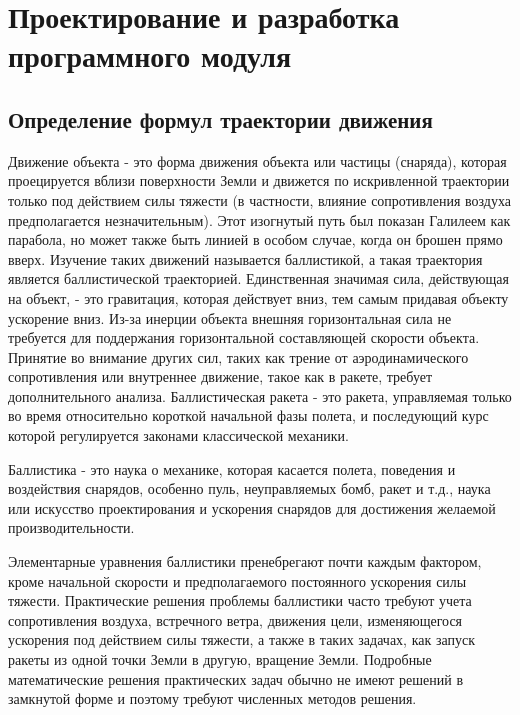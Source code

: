 \section{Проектирование и разработка программного модуля}
\label{sub:domain:sec_project}
\lstset{style=fsharpstyle}  



\subsection{Определение формул траектории движения}

Движение объекта - это форма движения объекта или частицы (снаряда), которая проецируется вблизи поверхности Земли и движется по искривленной траектории только под действием силы тяжести (в частности, влияние сопротивления воздуха предполагается незначительным). Этот изогнутый путь был показан Галилеем как парабола, но может также быть линией в особом случае, когда он брошен прямо вверх. Изучение таких движений называется баллистикой, а такая траектория является баллистической траекторией. Единственная значимая сила, действующая на объект, - это гравитация, которая действует вниз, тем самым придавая объекту ускорение вниз. Из-за инерции объекта внешняя горизонтальная сила не требуется для поддержания горизонтальной составляющей скорости объекта. Принятие во внимание других сил, таких как трение от аэродинамического сопротивления или внутреннее движение, такое как в ракете, требует дополнительного анализа. Баллистическая ракета - это ракета, управляемая только во время относительно короткой начальной фазы полета, и последующий курс которой регулируется законами классической механики.

Баллистика - это наука о механике, которая касается полета, поведения и воздействия снарядов, особенно пуль, неуправляемых бомб, ракет и т.д., наука или искусство проектирования и ускорения снарядов для достижения желаемой производительности.

Элементарные уравнения баллистики пренебрегают почти каждым фактором, кроме начальной скорости и предполагаемого постоянного ускорения силы тяжести. Практические решения проблемы баллистики часто требуют учета сопротивления воздуха, встречного ветра, движения цели, изменяющегося ускорения под действием силы тяжести, а также в таких задачах, как запуск ракеты из одной точки Земли в другую, вращение Земли. Подробные математические решения практических задач обычно не имеют решений в замкнутой форме и поэтому требуют численных методов решения.


